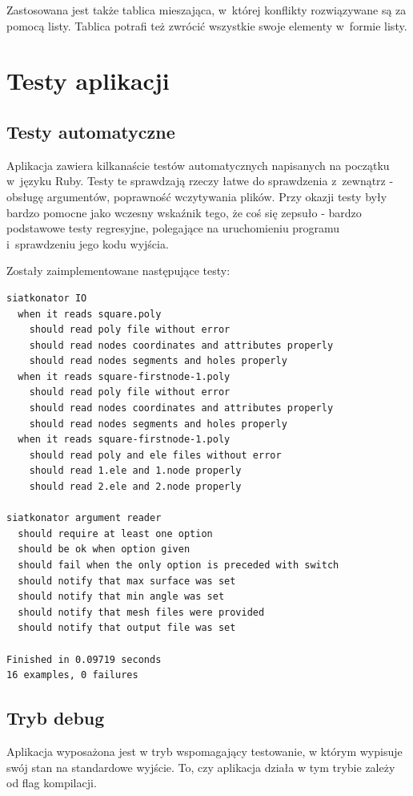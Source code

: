 \documentclass[a4paper]{article} \usepackage{setspace}
\begin{document}
Zastosowana jest także tablica mieszająca, w~której konflikty rozwiązywane są za pomocą listy.
Tablica potrafi też zwrócić wszystkie swoje elementy w~formie listy.


\section{Testy aplikacji}
\subsection{Testy automatyczne}
Aplikacja zawiera kilkanaście testów automatycznych napisanych na początku w~języku Ruby.
Testy te sprawdzają rzeczy łatwe do sprawdzenia z~zewnątrz - obsługę argumentów, poprawność wczytywania plików.
Przy okazji testy były bardzo pomocne jako wczesny wskaźnik tego, że coś się zepsuło - bardzo podstawowe testy regresyjne, polegające na uruchomieniu programu i~sprawdzeniu jego kodu wyjścia.

Zostały zaimplementowane następujące testy:
\begin{lstlisting}[caption=Testy automatyczne]
siatkonator IO
  when it reads square.poly
    should read poly file without error
    should read nodes coordinates and attributes properly
    should read nodes segments and holes properly
  when it reads square-firstnode-1.poly
    should read poly file without error
    should read nodes coordinates and attributes properly
    should read nodes segments and holes properly
  when it reads square-firstnode-1.poly
    should read poly and ele files without error
    should read 1.ele and 1.node properly
    should read 2.ele and 2.node properly

siatkonator argument reader
  should require at least one option
  should be ok when option given
  should fail when the only option is preceded with switch
  should notify that max surface was set
  should notify that min angle was set
  should notify that mesh files were provided
  should notify that output file was set

Finished in 0.09719 seconds
16 examples, 0 failures

\end{lstlisting}

\subsection{Tryb debug}
Aplikacja wyposażona jest w tryb wspomagający testowanie, w którym wypisuje swój stan na standardowe wyjście.
To, czy aplikacja działa w tym trybie zależy od flag kompilacji.
\end{document}

